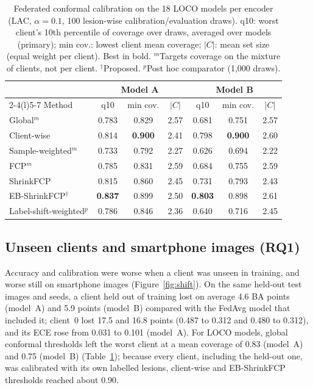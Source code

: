 \documentclass[VANCOUVER,Times1COL]{WileyNJDv5}
\begin{document}
\begin{table}[!t]
\centering
\caption{Federated conformal calibration on the 18 LOCO models per encoder (LAC, $\alpha=0.1$, 100
lesion-wise calibration/evaluation draws). q10: worst client's 10th percentile of coverage over draws,
averaged over models (primary); min cov.: lowest client mean coverage; $|C|$: mean set size (equal weight
per client). Best in bold. $^m$Targets coverage on the mixture of clients, not per client.
$^\dagger$Proposed. $^p$Post hoc comparator (1,000 draws).}
\label{tab:conformal}
\setlength{\tabcolsep}{2.6pt}
\begin{tabular}{@{}lcccccc@{}}
\toprule
 & \multicolumn{3}{c}{Model A} & \multicolumn{3}{c}{Model B} \\
\cmidrule(lr){2-4}\cmidrule(l){5-7}
Method & q10 & min cov. & $|C|$ & q10 & min cov. & $|C|$ \\
\midrule
Global$^m$ & 0.783 & 0.829 & 2.57 & 0.681 & 0.751 & 2.57 \\
Client-wise & 0.814 & \textbf{0.900} & 2.41 & 0.798 & \textbf{0.900} & 2.60 \\
Sample-weighted$^m$ & 0.733 & 0.792 & 2.27 & 0.626 & 0.694 & 2.22 \\
FCP$^m$ & 0.785 & 0.831 & 2.59 & 0.684 & 0.755 & 2.59 \\
ShrinkFCP & 0.815 & 0.860 & 2.45 & 0.731 & 0.793 & 2.43 \\
EB-ShrinkFCP$^\dagger$ & \textbf{0.837} & 0.899 & 2.50 & \textbf{0.803} & 0.898 & 2.61 \\
Label-shift-weighted$^p$ & 0.786 & 0.846 & 2.36 & 0.640 & 0.716 & 2.45 \\
\bottomrule
\end{tabular}
\end{table}


\subsection{Unseen clients and smartphone images (RQ1)}
\label{sec:res-shift}

Accuracy and calibration were worse when a client was unseen in training, and worse still on smartphone
images (Figure~\ref{fig:shift}). On the same held-out test images and seeds, a client held out of training
lost on average 4.6 BA points (model~A) and 5.9 points (model~B) compared with the FedAvg model that
included it; client~0 lost 17.5 and 16.8 points (0.487 to 0.312 and 0.480 to 0.312), and its ECE rose from
0.031 to 0.101 (model~A). For LOCO models, global conformal thresholds left the worst client at a mean
coverage of 0.83 (model~A) and 0.75 (model~B) (Table~\ref{tab:conformal}); because every client, including
the held-out one, was calibrated with its own labelled lesions, client-wise and EB-ShrinkFCP thresholds
reached about 0.90.
\end{document}
